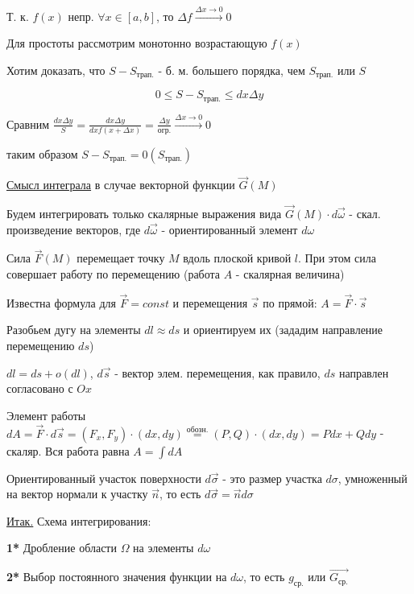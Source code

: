 \documentclass[12pt]{article}
\begin{document}
    Т. к. $f(x)$ непр. $\forall x \in [a, b]$, то $\Delta f \stackrel{\Delta x \to 0}{\rightarrow} 0$

    Для простоты рассмотрим монотонно возрастающую $f(x)$

    Хотим доказать, что $S - S_{\text{трап.}}$ - б. м. большего порядка, чем $S_{\text{трап.}}$ или $S$

    \[0 \leq S - S_{\text{трап.}} \leq dx \Delta y\]

    Сравним $\frac{dx \Delta y}{S} = \frac{dx \Delta y}{dx f(x + \Delta x)} = \frac{\Delta y}{\text{огр.}} \stackrel{\Delta x \to 0}{\rightarrow} 0$

    таким образом $S - S_{\text{трап.}} = 0 (S_{\text{трап.}})$

    \underline{Смысл интеграла} в случае векторной функции $\overrightarrow{G}(M)$

    Будем интегрировать только скалярные выражения вида $\overrightarrow{G}(M) \cdot d\overrightarrow{\omega}$ - скал. произведение векторов,
    где $d\overrightarrow{\omega}$ - ориентированный элемент $d\omega$

    \Ex Сила $\overrightarrow{F}(M)$ перемещает точку $M$ вдоль плоской кривой $l$. При этом сила совершает работу по перемещению
    (работа $A$ - скалярная величина)

    Известна формула для $\overrightarrow{F} = const$ и перемещения $\overrightarrow{s}$ по прямой: $A = \overrightarrow{F} \cdot \overrightarrow{s}$

    Разобьем дугу на элементы $dl \approx ds$ и ориентируем их (зададим направление перемещению $ds$)

    $dl = ds + o(dl)$, $d\overrightarrow{s}$ - вектор элем. перемещения, как правило, $ds$ направлен согласовано с $Ox$

    Элемент работы $dA = \overrightarrow{F} \cdot d\overrightarrow{s} = (F_x, F_y) \cdot (dx, dy) \stackrel{\text{обозн.}}{=}
    (P, Q) \cdot (dx, dy) = Pdx + Qdy$ - скаляр. Вся работа равна $A = \int dA$

    \Nota Ориентированный участок поверхности $d\overrightarrow{\sigma}$ - это размер участка $d\sigma$, умноженный на вектор нормали к участку $\overrightarrow{n}$,
    то есть $d\overrightarrow{\sigma} = \overrightarrow{n}d\sigma$

    \underline{Итак.} Схема интегрирования:

    \textbf{1*} Дробление области $\Omega$ на элементы $d\omega$

    \textbf{2*} Выбор постоянного значения функции на $d\omega$, то есть $g_{\text{ср.}}$ или $\overrightarrow{G_\text{ср.}}$
\end{document}
